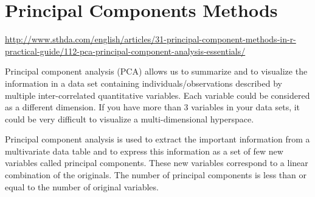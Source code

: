 \documentclass[]{book}
\newenvironment{Shaded}{\begin{snugshade}}{\end{snugshade}}
\newcommand{\CommentTok}[1]{\textcolor[rgb]{0.56,0.35,0.01}{\textit{#1}}}
\newcommand{\ControlFlowTok}[1]{\textcolor[rgb]{0.13,0.29,0.53}{\textbf{#1}}}
\newcommand{\DecValTok}[1]{\textcolor[rgb]{0.00,0.00,0.81}{#1}}
\newcommand{\KeywordTok}[1]{\textcolor[rgb]{0.13,0.29,0.53}{\textbf{#1}}}
\newcommand{\NormalTok}[1]{#1}
\newcommand{\OperatorTok}[1]{\textcolor[rgb]{0.81,0.36,0.00}{\textbf{#1}}}
\newcommand{\StringTok}[1]{\textcolor[rgb]{0.31,0.60,0.02}{#1}}
\begin{document}
\begin{Shaded}
\end{Shaded}

\hypertarget{principal-components-methods}{%
\chapter{Principal Components Methods}\label{principal-components-methods}}

\url{http://www.sthda.com/english/articles/31-principal-component-methods-in-r-practical-guide/112-pca-principal-component-analysis-essentials/}

Principal component analysis (PCA) allows us to summarize and to visualize the information in a data set containing individuals/observations described by multiple inter-correlated quantitative variables. Each variable could be considered as a different dimension. If you have more than 3 variables in your data sets, it could be very difficult to visualize a multi-dimensional hyperspace.

Principal component analysis is used to extract the important information from a multivariate data table and to express this information as a set of few new variables called principal components. These new variables correspond to a linear combination of the originals. The number of principal components is less than or equal to the number of original variables.
\end{document}
